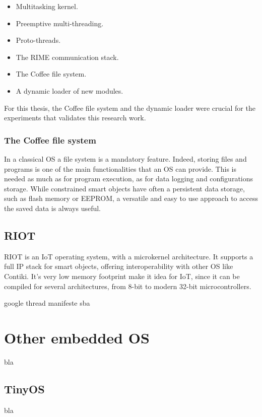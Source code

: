 \begin{itemize}
	\item Multitasking kernel.
	\item Preemptive multi-threading.
	\item Proto-threads\cite{dunkels2006protothreads}.
	\item The RIME communication stack\cite{dunkels2007rime}.
	\item The Coffee file system\cite{tsiftes09enabling}.
	\item A dynamic loader of new modules\cite{dunkels06runtime}.
\end{itemize}

For this thesis, the Coffee file system and the dynamic loader were crucial for the experiments that validates this research work.

\subsubsection{The Coffee file system}
In a classical OS a file system is a mandatory feature.
Indeed, storing files and programs is one of the main functionalities that an OS can provide.
This is needed as much as for program execution, as for data logging and configurations storage.
While constrained smart objects have often a persistent data storage, such as flash memory or EEPROM, a versatile and easy to use approach to access the saved data is always useful.


\subsection{RIOT}
RIOT is an IoT operating system\cite{baccelli2013riot}, with a microkernel architecture.
It supports a full IP stack for smart objects, offering interoperability with other OS like Contiki.
It's very low memory footprint make it idea for IoT, since it can be compiled for several architectures, from 8-bit to modern 32-bit microcontrollers.

google thread
manifeste sba

\section{Other embedded OS}
bla

\subsection{TinyOS}
bla
